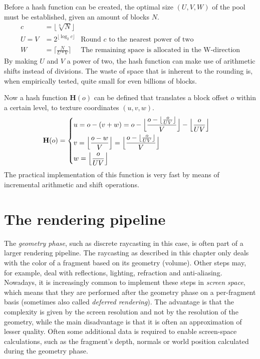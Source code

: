 Before a hash function can be created, the optimal size $(U,V,W)$ of the pool must be established, given an amount of blocks $N$.
\begin{align*}
c &= \lfloor \sqrt[3]{N} \rfloor\\
U = V &= 2^{\lfloor \log_2{c} \rfloor} &\text{Round $c$ to the nearest power of two}\\
W &= \lceil \frac{N}{U*V} \rceil &\text{The remaining space is allocated in the W-direction}
\end{align*}
By making $U$ and $V$ a power of two, the hash function can make use of arithmetic shifts instead of divisions. The waste of space that is inherent to the rounding is, when empirically tested, quite small for even billions of blocks.

Now a hash function $\mathbf{H}(o)$ can be defined that translates a block offset $o$ within a certain level, to texture coordinates $(u,v,w)$. 
\begin{align*}
\mathbf{H}(o) &= \begin{dcases} 
    u = o - (v + w) = o - \Big\lfloor \frac{o - \lfloor \frac{o}{UV} \rfloor }{V} \Big\rfloor - \Big\lfloor \frac{o}{UV} \Big\rfloor\\
    v = \Big\lfloor \frac{o-w}{V}  \Big\rfloor = \Big\lfloor \frac{o - \lfloor \frac{o}{UV} \rfloor }{V}  \Big\rfloor \\
    w = \Big\lfloor \frac{o}{UV} \Big\rfloor
\end{dcases}
\end{align*}
The practical implementation of this function is very fast by means of incremental arithmetic and shift operations.
%
\section{The rendering pipeline}
%
The \emph{geometry phase}, such as discrete raycasting in this case, is often part of a larger rendering pipeline. The raycasting as described in this chapter only deals with the color of a fragment based on its geometry (volume). Other steps may, for example, deal with reflections, lighting, refraction and anti-aliasing. Nowadays, it is increasingly common to implement these steps in \emph{screen space}, which means that they are performed after the geometry phase on a per-fragment basis (sometimes also called \emph{deferred rendering}). The advantage is that the complexity is given by the screen resolution and not by the resolution of the geometry, while the main disadvantage is that it is often an approximation of lesser quality. Often some additional data is required to enable screen-space calculations, such as the fragment's depth, normals or world position calculated during the geometry phase. 

